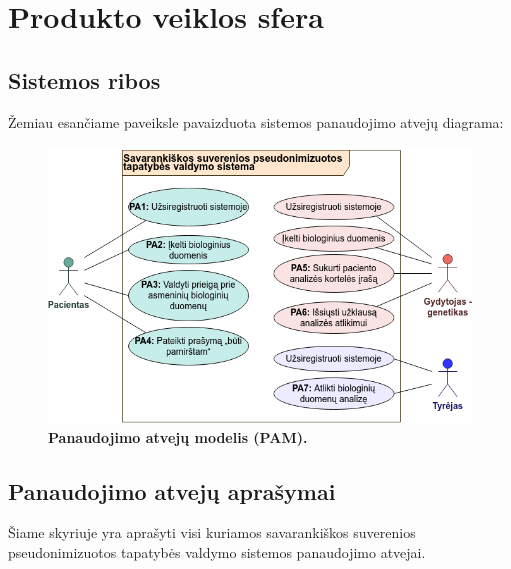 \documentclass[12pt]{article}
\begin{document}
\newpage

\section{Produkto veiklos sfera}
\subsection{Sistemos ribos}
Žemiau esančiame paveiksle pavaizduota sistemos panaudojimo atvejų diagrama:

\begin{figure}[ht]
    \begin{center}
        \captionsetup{justification=centering}
        \includegraphics[width=0.9\linewidth]{PAM.png}
        \vspace{-1\baselineskip}
        \caption{\small\textbf{Panaudojimo atvejų modelis (PAM).}}
        \label{fig:image2}
    \end{center}
\end{figure}

\newpage

\subsection{Panaudojimo atvejų aprašymai}
Šiame skyriuje yra aprašyti visi kuriamos savarankiškos suverenios
pseudonimizuotos tapatybės valdymo sistemos panaudojimo atvejai.

\newpage
\end{document}
